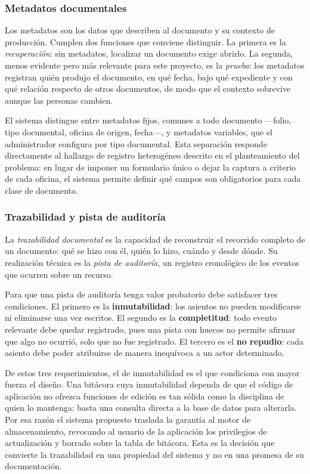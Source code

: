 \subsubsection{Metadatos documentales}

Los metadatos son los datos que describen al documento y su contexto de producción. Cumplen dos funciones que conviene distinguir. La primera es la \emph{recuperación}: sin metadatos, localizar un documento exige abrirlo. La segunda, menos evidente pero más relevante para este proyecto, es la \emph{prueba}: los metadatos registran quién produjo el documento, en qué fecha, bajo qué expediente y con qué relación respecto de otros documentos, de modo que el contexto sobrevive aunque las personas cambien.

El sistema distingue entre metadatos fijos, comunes a todo documento —folio, tipo documental, oficina de origen, fecha—, y metadatos variables, que el administrador configura por tipo documental. Esta separación responde directamente al hallazgo de registro heterogéneo descrito en el planteamiento del problema: en lugar de imponer un formulario único o dejar la captura a criterio de cada oficina, el sistema permite definir qué campos son obligatorios para cada clase de documento.

\subsubsection{Trazabilidad y pista de auditoría}

La \emph{trazabilidad documental} es la capacidad de reconstruir el recorrido completo de un documento: qué se hizo con él, quién lo hizo, cuándo y desde dónde. Su realización técnica es la \emph{pista de auditoría}, un registro cronológico de los eventos que ocurren sobre un recurso.

Para que una pista de auditoría tenga valor probatorio debe satisfacer tres condiciones. El primero es la \textbf{inmutabilidad}: los asientos no pueden modificarse ni eliminarse una vez escritos. El segundo es la \textbf{completitud}: todo evento relevante debe quedar registrado, pues una pista con huecos no permite afirmar que algo no ocurrió, solo que no fue registrado. El tercero es el \textbf{no repudio}: cada asiento debe poder atribuirse de manera inequívoca a un actor determinado.

De estos tres requerimientos, el de inmutabilidad es el que condiciona con mayor fuerza el diseño. Una bitácora cuya inmutabilidad dependa de que el código de aplicación no ofrezca funciones de edición es tan sólida como la disciplina de quien lo mantenga: basta una consulta directa a la base de datos para alterarla. Por esa razón el sistema propuesto traslada la garantía al motor de almacenamiento, revocando al usuario de la aplicación los privilegios de actualización y borrado sobre la tabla de bitácora. Esta es la decisión que convierte la trazabilidad en una propiedad del sistema y no en una promesa de su documentación.

